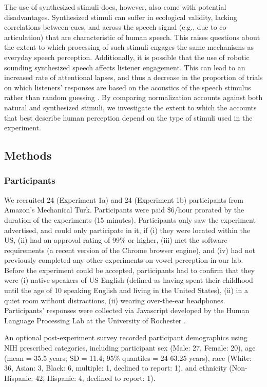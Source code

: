 \documentclass[preprint]{JASA}
\begin{document}
The use of synthesized stimuli does, however, also come with potential disadvantages. Synthesized stimuli can suffer in ecological validity, lacking correlations between cues, and across the speech signal (e.g., due to co-articulation) that are characteristic of human speech. This raises questions about the extent to which processing of such stimuli engages the same mechanisms as everyday speech perception. Additionally, it is possible that the use of robotic sounding synthesized speech affects listener engagement. This can lead to an increased rate of attentional lapses, and thus a decrease in the proportion of trials on which listeners' responses are based on the acoustics of the speech stimulus rather than random guessing \citep[compare, e.g.,][]{kleinschmidt2020, tan-jaeger2024}. By comparing normalization accounts against both natural and synthesized stimuli, we investigate the extent to which the accounts that best describe human perception depend on the type of stimuli used in the experiment.

\subsection{Methods}\label{sec:methods}

\subsubsection{Participants}\label{sec:participants}

We recruited 24 (Experiment 1a) and 24 (Experiment 1b) participants from Amazon's Mechanical Turk. Participants were paid \$6/hour prorated by the duration of the experiments (15 minutes). Participants only saw the experiment advertised, and could only participate in it, if (i) they were located within the US, (ii) had an approval rating of 99\% or higher, (iii) met the software requirements (a recent version of the Chrome browser engine), and (iv) had not previously completed any other experiments on vowel perception in our lab. Before the experiment could be accepted, participants had to confirm that they were (i) native speakers of US English (defined as having spent their childhood until the age of 10 speaking English and living in the United States), (ii) in a quiet room without distractions, (ii) wearing over-the-ear headphones. Participants' responses were collected via Javascript developed by the Human Language Processing Lab at the University of Rochester \citep{kleinschmidt2021}.

An optional post-experiment survey recorded participant demographics using NIH prescribed categories, including participant sex (Male: 27, Female: 20), age (mean = 35.5 years; SD = 11.4; 95\% quantiles = 24-63.25 years), race (White: 36, Asian: 3, Black: 6, multiple: 1, declined to report: 1), and ethnicity (Non-Hispanic: 42, Hispanic: 4, declined to report: 1).
\end{document}

